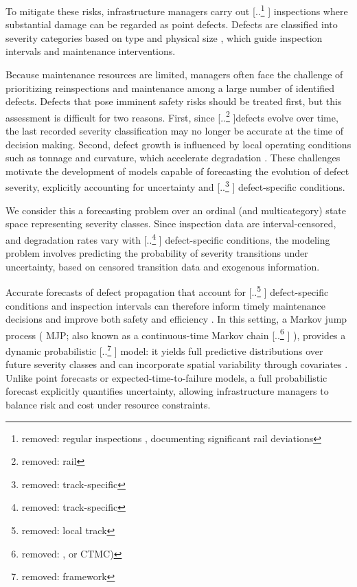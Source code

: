 \documentclass{article}
\providecommand{\DIFadd}[1]{{\protect\color{blue} \sf #1}} %
\providecommand{\DIFdel}[1]{{\protect\color{red} [..\footnote{removed: #1} ]}} %
\providecommand{\DIFaddbegin}{} %
\providecommand{\DIFaddend}{} %
\providecommand{\DIFdelbegin}{} %
\providecommand{\DIFdelend}{} %
\begin{document}
To mitigate these risks, infrastructure managers carry out \DIFdelbegin \DIFdel{regular inspections , documenting significant rail deviations }\DIFdelend \DIFaddbegin \DIFadd{inspections where substantial damage can be regarded }\DIFaddend as point defects. 
Defects are classified into severity categories based on type and physical size \citep{UIC_2002_defecthandbook}, which guide inspection intervals and maintenance interventions.  

Because maintenance resources are limited, managers often face the challenge of prioritizing \DIFaddbegin \DIFadd{reinspections and maintenance }\DIFaddend among a large number of identified defects.
Defects that pose imminent safety risks should be treated first, but this assessment is difficult for two reasons. 
First, since \DIFdelbegin \DIFdel{rail }\DIFdelend defects evolve over time, the last recorded severity classification may no longer be accurate at the time of decision making.
Second, defect growth is influenced by local operating conditions such as tonnage and curvature, which accelerate degradation \citep{bai2017a,Kumar2008HolisticSweden}.
These challenges motivate the development of models capable of forecasting the evolution of defect severity, explicitly accounting for uncertainty and \DIFdelbegin \DIFdel{track-specific }\DIFdelend \DIFaddbegin \DIFadd{defect-specific }\DIFaddend conditions.

We consider this a forecasting problem over an ordinal (and multicategory) state space representing severity classes. Since inspection data are interval-censored, and degradation rates vary with \DIFdelbegin \DIFdel{track-specific }\DIFdelend \DIFaddbegin \DIFadd{defect-specific }\DIFaddend conditions, the modeling problem involves predicting the probability of severity transitions under uncertainty, based on censored transition data and exogenous information.

Accurate forecasts of defect propagation that account for \DIFdelbegin \DIFdel{local track }\DIFdelend \DIFaddbegin \DIFadd{defect-specific }\DIFaddend conditions and inspection intervals can therefore inform timely maintenance decisions and improve both safety and efficiency \citep{Binder2023}. In this setting, a Markov jump process (\DIFaddbegin \DIFadd{MJP; }\DIFaddend also known as a continuous-time Markov chain\DIFdelbegin \DIFdel{, or CTMC)}\DIFdelend \DIFaddbegin \DIFadd{), }\DIFaddend provides a dynamic probabilistic \DIFdelbegin \DIFdel{framework}\DIFdelend \DIFaddbegin \DIFadd{model}\DIFaddend : it yields full predictive distributions over future severity classes and can incorporate spatial variability through covariates \citep{bisgaard2024A}. Unlike point forecasts or expected-time-to-failure models, a full probabilistic forecast explicitly quantifies uncertainty, allowing infrastructure managers to balance risk and cost under resource constraints.
\end{document}
